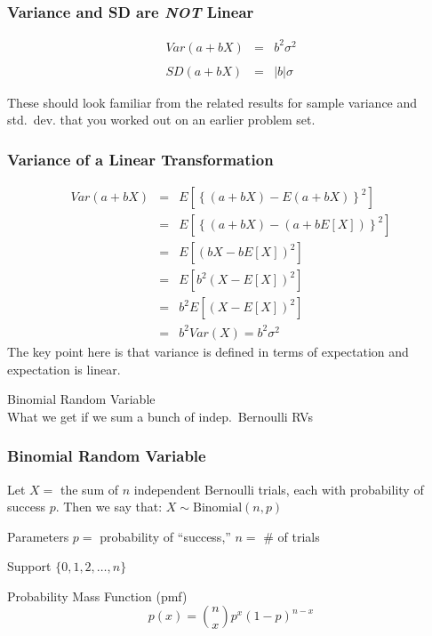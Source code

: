 \documentclass[handout]{beamer}
\begin{document}
\begin{frame}
	\frametitle{Variance and SD are \emph{NOT} Linear}

\begin{eqnarray*}
Var(a + bX) &= &b^2 \sigma^2 \\\\
	SD(a + bX)&=& |b| \sigma
\end{eqnarray*}

\vspace{2em}
\begin{block}{These should look familiar from the related results for sample variance and std.\ dev. that you worked out on an earlier problem set.}

\end{block}

\end{frame}
\begin{frame}
\frametitle{Variance of a Linear Transformation}

\begin{eqnarray*}
 Var(a + bX) &=& E\left[\left\{(a+bX) - E(a+bX)\right\}^2 \right] \\ 
 	&=& E\left[\left\{(a+bX) - (a+bE[X])\right\}^2 \right] \\
 	&=&E\left[\left(bX - bE[X]\right)^2 \right] \\ 
 	&=&E[b^2 (X - E[X])^2]\\ 
 	&=& b^2 E[(X-E[X])^2]\\ 
 	&=& b^2 Var(X) = b^2 \sigma^2
\end{eqnarray*}
\alert{The key point here is that variance is defined in terms of expectation and expectation is linear.}

\end{frame}
\begin{frame}
	\begin{center}
		\Huge Binomial Random Variable	\\
		\large What we get if we sum a bunch of indep.\ Bernoulli RVs
	\end{center}
\end{frame}


\begin{frame}
\frametitle{Binomial Random Variable}
Let $X = $ the sum of $n$ independent Bernoulli trials, each with probability of success $p$.  \alert{Then we say that:
		$X \sim \mbox{Binomial}(n,p)$} 

\vspace{2em}
\begin{block}{Parameters}
$p =$ probability of ``success,'' $n=$ \# of trials
\end{block}
\begin{block}{Support} 
$\{0, 1, 2, \hdots, n\}$ 
\end{block}
\begin{block}{Probability Mass Function (pmf)} 
$$p(x) = {n \choose x} p^x (1-p)^{n-x}$$ 
\end{block}
\end{frame}
\end{document}
